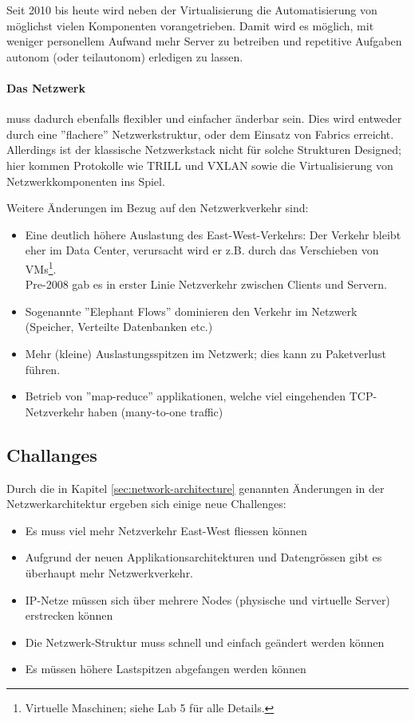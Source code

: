 Seit 2010 bis heute wird neben der Virtualisierung die Automatisierung von möglichst vielen Komponenten vorangetrieben. Damit wird es möglich, mit weniger personellem Aufwand mehr Server zu betreiben und repetitive Aufgaben autonom (oder teilautonom) erledigen zu lassen.

\paragraph{Das Netzwerk} muss dadurch ebenfalls flexibler und einfacher änderbar sein. Dies wird entweder durch eine ''flachere'' Netzwerkstruktur, oder dem Einsatz von Fabrics erreicht. Allerdings ist der klassische Netzwerkstack nicht für solche Strukturen Designed; hier kommen Protokolle wie TRILL und VXLAN sowie die Virtualisierung von Netzwerkkomponenten ins Spiel.

Weitere Änderungen im Bezug auf den Netzwerkverkehr sind: 
\begin{itemize}
	\item Eine deutlich höhere Auslastung des East-West-Verkehrs: Der Verkehr bleibt eher im Data Center, verursacht wird er z.B. durch das Verschieben von VMs\footnote{Virtuelle Maschinen; siehe Lab 5 für alle Details.}. \hfill \\
		 Pre-2008 gab es in erster Linie Netzverkehr zwischen Clients und Servern.
	\item Sogenannte ''Elephant Flows'' dominieren den Verkehr im Netzwerk (Speicher, Verteilte Datenbanken etc.)
	\item Mehr (kleine) Auslastungsspitzen im Netzwerk; dies kann zu Paketverlust führen.
	\item Betrieb von ''map-reduce'' applikationen, welche viel eingehenden TCP-Netzverkehr haben (many-to-one traffic)
\end{itemize}


\subsection{Challanges}

Durch die in Kapitel \ref{sec:network-architecture} genannten Änderungen in der Netzwerkarchitektur ergeben sich einige neue Challenges:
\begin{itemize}
	\item Es muss viel mehr Netzverkehr East-West fliessen können
	\item Aufgrund der neuen Applikationsarchitekturen und Datengrössen gibt es überhaupt mehr Netzwerkverkehr.
	\item IP-Netze müssen sich über mehrere Nodes (physische und virtuelle Server) erstrecken können
	\item Die Netzwerk-Struktur muss schnell und einfach geändert werden können
	\item Es müssen höhere Lastspitzen abgefangen werden können
\end{itemize}

